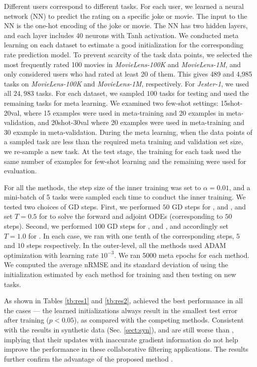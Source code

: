 Different users correspond to different tasks. For each user, we learned a neural network (NN) to predict the rating on a specific joke or movie. The input to the NN is the one-hot encoding of the joke or movie. The NN has two hidden layers, and each layer includes 40 neurons with Tanh activation. We conducted meta learning on each dataset to estimate a good initialization for the corresponding rate prediction model. To prevent scarcity of the task data points, we selected the most frequently rated 100 movies in \textit{MovieLens-100K} and \textit{MovieLens-1M}, and only considered users who had rated at least 20 of them. This gives 489 and 4,985 tasks  on \textit{MovieLens-100K} and \textit{MovieLens-1M}, respectively. For \textit{Jester-1}, we used all $24,983$ tasks. For each dataset, we sampled $100$ tasks for testing and used the remaining tasks  for meta learning. We examined two few-shot settings: 15shot-20val,  where 15 examples were used in meta-training and 20 examples in meta-validation, and 20shot-30val where 20 examples were used in meta-training and 30 example in meta-validation. During the meta learning, when the data points of a sampled task are less than the required meta training and validation set size, we re-sample a new task. 
At the test stage, the training for each task used the same number of examples for few-shot learning and the remaining were used for evaluation. 

For all the methods, the step size of the inner training was set to $\alpha = 0.01$, and a mini-batch of 5 tasks were sampled each time to conduct the inner training. We tested two choices of GD steps. First, we performed $50$ GD steps for \imaml, \fomaml and \rap, and set $T=0.5$ for \ours to solve the forward and adjoint ODEs (corresponding to $50$ steps). Second, we performed $100$ GD steps for \imaml, \fomaml and \rap, and accordingly set $T=1.0$ for \ours.  In each case, we ran \maml with one tenth of the corresponding steps, \ie $5$ and $10$ steps respectively.  
In the outer-level, all the methods used ADAM optimization with learning rate $10^{-3}$. We ran 5000 meta epochs for each method. We computed the average nRMSE and its standard deviation of using the initialization estimated by each method for training and then testing on new tasks. 

As shown in Tables \ref{tb:res1} and \ref{tb:res2}, \ours achieved the best performance in all the cases --- the learned initializations always result in the smallest test error after training ($p<0.05$), as compared with the competing methods. Consistent with the results in synthetic data (Sec. \ref{sect:syn}), \fomaml and \rap are still worse than \maml, implying that their updates with inaccurate gradient information do not help improve the performance in these collaborative filtering applications. The results further confirm the advantage of the proposed method \ours. 

